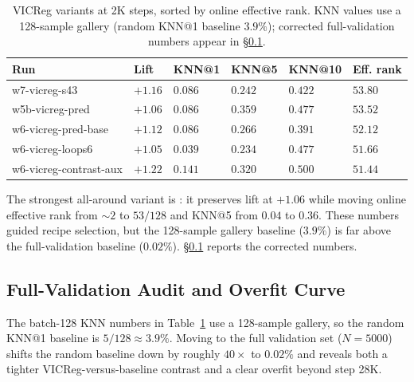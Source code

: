 \begin{table}[t]
\centering
\caption{VICReg variants at 2K steps, sorted by online effective
rank.  KNN values use a 128-sample gallery (random KNN@1 baseline
$3.9\%$); corrected full-validation numbers appear in
\S\ref{subsec:fullval}.}
\label{tab:vicreg_screen}
\smallskip
\begin{tabular}{llllll}
\toprule
Run & Lift & KNN@1 & KNN@5 & KNN@10 & Eff. rank \\
\midrule
w7-vicreg-s43 & $+1.16$ & $0.086$ & $0.242$ & $0.422$ & $53.80$ \\
w5b-vicreg-pred & $+1.06$ & $0.086$ & $0.359$ & $0.477$ & $53.52$ \\
w6-vicreg-pred-base & $+1.12$ & $0.086$ & $0.266$ & $0.391$ & $52.12$ \\
w6-vicreg-loops6 & $+1.05$ & $0.039$ & $0.234$ & $0.477$ & $51.66$ \\
w6-vicreg-contrast-aux & $+1.22$ & $0.141$ & $0.320$ & $0.500$ & $51.44$ \\
\bottomrule
\end{tabular}
\end{table}

The strongest all-around variant is : it
preserves lift at $+1.06$ while moving online effective rank from
$\sim\!2$ to $53/128$ and KNN@5 from $0.04$ to $0.36$.  These numbers
guided recipe selection, but the 128-sample gallery baseline ($3.9\%$)
is far above the full-validation baseline ($0.02\%$).
\S\ref{subsec:fullval} reports the corrected numbers.

\subsection{Full-Validation Audit and Overfit Curve}
\label{subsec:fullval}

The batch-128 KNN numbers in Table~\ref{tab:vicreg_screen} use a 128-sample
gallery, so the random KNN@1 baseline is $5/128 \approx 3.9\%$.  Moving to
the full validation set ($N=5000$) shifts the random baseline down by
roughly $40\times$ to $0.02\%$ and reveals both a tighter VICReg-versus-baseline
contrast and a clear overfit beyond step 28K.


